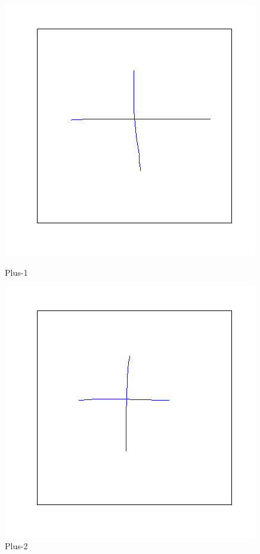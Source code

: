 \documentclass[a4paper, 10pt]{article}
\begin{document}
\begin{figure}[ht]
\begin{minipage}[b]{0.45\linewidth}
\centering
\includegraphics[width=\textwidth]{figs/+-1}
\caption{Plus-1}
\label{fig:figure1}
\end{minipage}
\hspace{0.5cm}
\begin{minipage}[b]{0.45\linewidth}
\centering
\includegraphics[width=\textwidth]{figs/+-2}
\caption{Plus-2}
\label{fig:figure2}
\end{minipage}
\end{figure}
\end{document}
